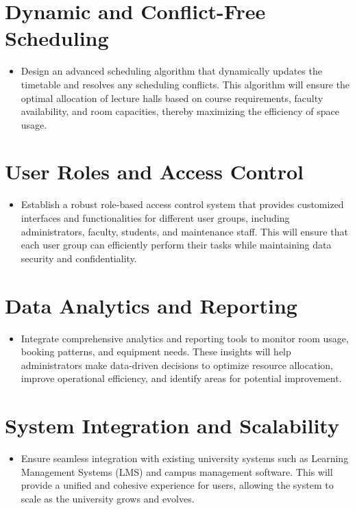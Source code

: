 \documentclass[12pt]{article}
\begin{document}
\section*{Dynamic and Conflict-Free Scheduling}

\begin{itemize}
    \item Design an advanced scheduling algorithm that dynamically updates the timetable and resolves any scheduling conflicts. This algorithm will ensure the optimal allocation of lecture halls based on course requirements, faculty availability, and room capacities, thereby maximizing the efficiency of space usage.
\end{itemize}

\section*{User Roles and Access Control}

\begin{itemize}
    \item Establish a robust role-based access control system that provides customized interfaces and functionalities for different user groups, including administrators, faculty, students, and maintenance staff. This will ensure that each user group can efficiently perform their tasks while maintaining data security and confidentiality.
\end{itemize}

\section*{Data Analytics and Reporting}

\begin{itemize}
    \item Integrate comprehensive analytics and reporting tools to monitor room usage, booking patterns, and equipment needs. These insights will help administrators make data-driven decisions to optimize resource allocation, improve operational efficiency, and identify areas for potential improvement.
\end{itemize}

\section*{System Integration and Scalability}

\begin{itemize}
    \item Ensure seamless integration with existing university systems such as Learning Management Systems (LMS) and campus management software. This will provide a unified and cohesive experience for users, allowing the system to scale as the university grows and evolves.
\end{itemize}
\end{document}
